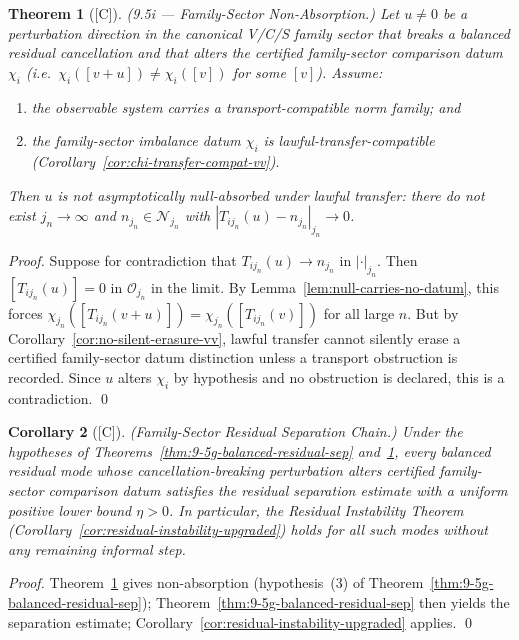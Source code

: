 \documentclass[12pt,oneside]{amsbook}
\theoremstyle{plain}
\newtheorem{theorem}{Theorem}[section]
\newtheorem{corollary}[theorem]{Corollary}
\theoremstyle{definition}
\theoremstyle{remark}
\newcommand{\status}[1]{\textup{[#1]}}
\begin{document}
\begin{theorem}[\status{C}]\label{thm:9-5i-non-absorption}
\textup{(9.5i --- Family-Sector Non-Absorption.)}
Let $u \neq 0$ be a perturbation direction in the canonical V/C/S
family sector that breaks a balanced residual cancellation and that
alters the certified family-sector comparison datum $\chi_i$ (i.e.\
$\chi_i([v+u]) \neq \chi_i([v])$ for some $[v]$).  Assume:
\begin{enumerate}[label=\textup{(\arabic*)}]
  \item the observable system carries a transport-compatible norm
    family; and
  \item the family-sector imbalance datum $\chi_i$ is
    lawful-transfer-compatible
    (Corollary~\ref{cor:chi-transfer-compat-vv}).
\end{enumerate}
Then $u$ is not asymptotically null-absorbed under lawful transfer:
there do not exist $j_n \to \infty$ and $n_{j_n} \in
\mathcal{N}_{j_n}$ with $|T_{ij_n}(u) - n_{j_n}|_{j_n} \to 0$.
\end{theorem}

\begin{proof}
Suppose for contradiction that $T_{ij_n}(u) \to n_{j_n}$ in
$|\cdot|_{j_n}$.  Then $[T_{ij_n}(u)] = 0$ in $\mathcal{O}_{j_n}$
in the limit.  By Lemma~\ref{lem:null-carries-no-datum}, this forces
$\chi_{j_n}([T_{ij_n}(v+u)]) = \chi_{j_n}([T_{ij_n}(v)])$ for all
large $n$.  But by Corollary~\ref{cor:no-silent-erasure-vv}, lawful
transfer cannot silently erase a certified family-sector datum
distinction unless a transport obstruction is recorded.  Since $u$
alters $\chi_i$ by hypothesis and no obstruction is declared, this is
a contradiction. \qed
\end{proof}

\begin{corollary}[\status{C}]\label{cor:9-5g-i-chain}
\textup{(Family-Sector Residual Separation Chain.)}
Under the hypotheses of Theorems~\ref{thm:9-5g-balanced-residual-sep}
and~\ref{thm:9-5i-non-absorption}, every balanced residual mode whose
cancellation-breaking perturbation alters certified family-sector
comparison datum satisfies the residual separation estimate with a
uniform positive lower bound $\eta > 0$.  In particular, the
Residual Instability Theorem
(Corollary~\ref{cor:residual-instability-upgraded}) holds for all
such modes without any remaining informal step.
\end{corollary}

\begin{proof}
Theorem~\ref{thm:9-5i-non-absorption} gives non-absorption
(hypothesis~(3) of Theorem~\ref{thm:9-5g-balanced-residual-sep});
Theorem~\ref{thm:9-5g-balanced-residual-sep} then yields the
separation estimate; Corollary~\ref{cor:residual-instability-upgraded}
applies. \qed
\end{proof}
\end{document}
